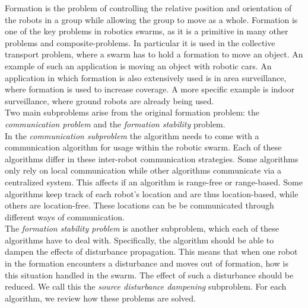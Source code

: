 
Formation is the problem of controlling the relative position and orientation of the robots in a group while allowing the group to move as a whole. \cite{consolini2008leader}
Formation is one of the key problems in robotics swarms, as it is a primitive in many other problems and composite-problems.
In particular it is used in the collective transport problem, where a swarm has to hold a formation to move an object. 
An example of such an application is moving an object with robotic cars. \cite{mas2012object}
An application in which formation is also extensively used is in area surveillance, where formation is used to increase coverage. \cite{burkle2011towards}
A more specific example is indoor surveillance, where ground robots are already being used. \cite{di2010autonomous, rybski2000team}
\\

Two main subproblems arise from the original formation problem: the \emph{communication problem} and the \emph{formation stability} problem.\\
In the \emph{communication subproblem} the algorithm needs to come with a communication algorithm for usage within the robotic swarm. 
Each of these algorithms differ in these inter-robot communication strategies. 
Some algorithms only rely on local communication while other algorithms communicate via a centralized system.
This affects if an algorithm is range-free or range-based. 
Some algorithms keep track of each robot's location and are thus location-based, while others are location-free.
These locations can be be communicated through different ways of communication. \\

The \emph{formation stability problem} is another subproblem, which each of these algorithms have to deal with.
Specifically, the algorithm should be able to dampen the effects of disturbance propagation. 
This means that when one robot in the formation encounters a disturbance and moves out of formation, how is this situation handled in the swarm. 
The effect of such a disturbance should be reduced.
We call this the \emph{source disturbance dampening} subproblem. 
For each algorithm, we review how these problems are solved.

